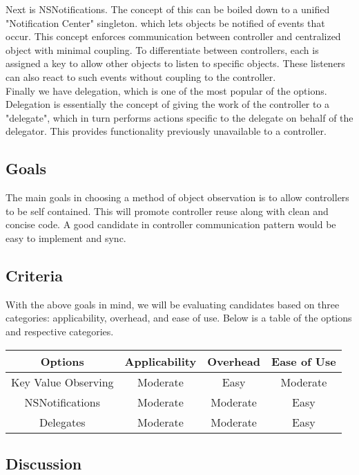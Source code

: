 \documentclass[letterpaper,10pt,titlepage]{article}
\begin{document}
Next is NSNotifications. The concept of this can be boiled down to a unified "Notification Center" singleton. which lets objects be notified of events that occur.\cite{observation1} This concept enforces communication between controller and centralized object with minimal coupling. To differentiate between controllers, each is assigned a key to allow other objects to listen to specific objects. These listeners can also react to such events without coupling to the controller.\\

Finally we have delegation, which is one of the most popular of the options. Delegation is essentially the concept of giving the work of the controller to a "delegate", which in turn performs actions specific to the delegate on behalf of the delegator.\cite{observation3} This provides functionality previously unavailable to a controller.

\subsection{Goals}

The main goals in choosing a method of object observation is to allow controllers to be self contained. This will promote controller reuse along with clean and concise code. A good candidate in controller communication pattern would be easy to implement and sync.

\subsection{Criteria}

With the above goals in mind, we will be evaluating candidates based on three categories: applicability, overhead, and ease of use. Below is a table of the options and respective categories.

\begin{center}
\begin{tabular}{ |c|c|c|c| }
 \hline
 Options & Applicability & Overhead & Ease of Use \\ \hline
 Key Value Observing & Moderate & Easy & Moderate \\ \hline
 NSNotifications & Moderate & Moderate & Easy \\ \hline
 Delegates & Moderate & Moderate & Easy \\
 \hline
\end{tabular}
\end{center}

\subsection{Discussion}
\end{document}
